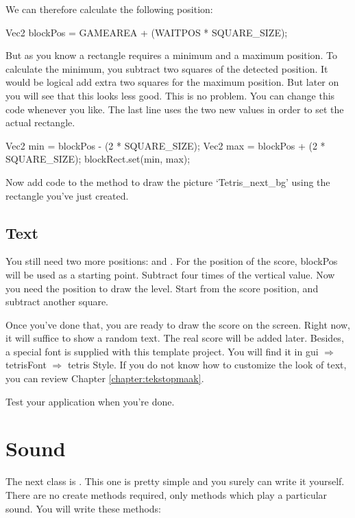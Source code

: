 We can therefore calculate the following position:

\begin{code}
Vec2 blockPos = GAMEAREA + (WAITPOS * SQUARE_SIZE);
\end{code}

But as you know a rectangle requires a minimum and a maximum position. To calculate the minimum, you subtract two squares of the detected position. It would be logical add extra two squares for the maximum position. But later on you will see that this looks less good. This is no problem. You can change this code whenever you like. The last line uses the two new values ​​in order to set the actual rectangle.

\begin{code}
Vec2 min = blockPos - (2 * SQUARE_SIZE);
Vec2 max = blockPos + (2 * SQUARE_SIZE);
blockRect.set(min, max);
\end{code}

Now add code to the  method to draw the picture `Tetris\_next\_bg' using the rectangle you've just created.

\subsection{Text}
You still need two more positions:  and . For the position of the score, blockPos will be used as a starting point. Subtract  four times of the vertical value. Now you need the position to draw the level. Start from the score position, and subtract another square.

Once you've done that, you are ready to draw the score on the screen. Right now, it will suffice to show a random text. The real score will be added later. Besides, a special font is supplied with this template project. You will find it in gui $\Rightarrow$ tetrisFont $\Rightarrow$ tetris Style. If you do not know how to customize the look of text, you can review Chapter \ref{chapter:tekstopmaak}.

Test your application when you're done.

\section{Sound}
The next class is . This one is pretty simple and you surely can write it yourself. There are no create methods required, only methods which play a particular sound. You will write these methods:

